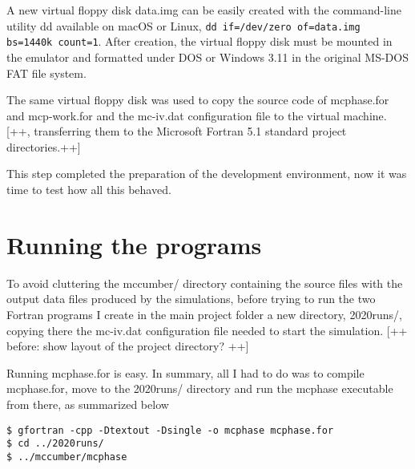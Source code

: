 A new virtual floppy disk \textsf{data.img} can be easily created with the command-line utility \textsf{dd} available on macOS or Linux, \lstinline[columns=fixed]{dd if=/dev/zero of=data.img bs=1440k count=1}. After creation, the virtual floppy disk must be mounted in the emulator and formatted under DOS or Windows 3.11 in the original MS-DOS FAT file system.



The same virtual floppy disk was used to copy the source code of \textsf{mcphase.for} and \textsf{mcp-work.for} and the \textsf{mc-iv.dat} configuration file to the virtual machine.
[++, transferring them to the Microsoft Fortran 5.1 standard project directories.++]

%

This step completed the preparation of the development environment, now it was time to test how all this behaved.



\section{Running the programs}

To avoid cluttering the \textsf{mccumber/} directory containing the source files with the output data files produced by the simulations, before trying to run the two Fortran programs I create in the main project folder a new directory, \textsf{2020runs/}, copying there the \textsf{mc-iv.dat} configuration file needed to start the simulation.
[++ before: show layout of the project directory? ++]

Running \textsf{mcphase.for} is easy. In summary, all I had to do was to compile \textsf{mcphase.for}, move to the \textsf{2020runs/} directory and run the \textsf{mcphase} executable from there, as summarized below

\begin{lstlisting}
$ gfortran -cpp -Dtextout -Dsingle -o mcphase mcphase.for
$ cd ../2020runs/
$ ../mccumber/mcphase
\end{lstlisting}

